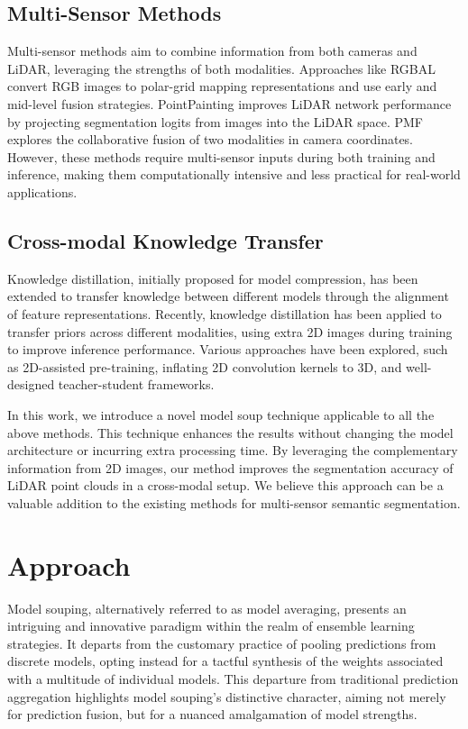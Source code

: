 \documentclass[10pt,twocolumn,letterpaper]{article}
\begin{document}
\subsection{Multi-Sensor Methods}

Multi-sensor methods aim to combine information from both cameras and LiDAR, leveraging the strengths of both modalities. Approaches like RGBAL convert RGB images to polar-grid mapping representations and use early and mid-level fusion strategies. PointPainting improves LiDAR network performance by projecting segmentation logits from images into the LiDAR space. PMF explores the collaborative fusion of two modalities in camera coordinates. However, these methods require multi-sensor inputs during both training and inference, making them computationally intensive and less practical for real-world applications.

\subsection{Cross-modal Knowledge Transfer}

Knowledge distillation, initially proposed for model compression, has been extended to transfer knowledge between different models through the alignment of feature representations. Recently, knowledge distillation has been applied to transfer priors across different modalities, using extra 2D images during training to improve inference performance. Various approaches have been explored, such as 2D-assisted pre-training, inflating 2D convolution kernels to 3D, and well-designed teacher-student frameworks.

In this work, we introduce a novel model soup technique applicable to all the above methods. This technique enhances the results without changing the model architecture or incurring extra processing time. By leveraging the complementary information from 2D images, our method improves the segmentation accuracy of LiDAR point clouds in a cross-modal setup. We believe this approach can be a valuable addition to the existing methods for multi-sensor semantic segmentation.

\section{ Approach }


Model souping, alternatively referred to as model averaging, presents an intriguing and innovative paradigm within the realm of ensemble learning strategies. It departs from the customary practice of pooling predictions from discrete models, opting instead for a tactful synthesis of the weights associated with a multitude of individual models. This departure from traditional prediction aggregation highlights model souping's distinctive character, aiming not merely for prediction fusion, but for a nuanced amalgamation of model strengths.
\end{document}
